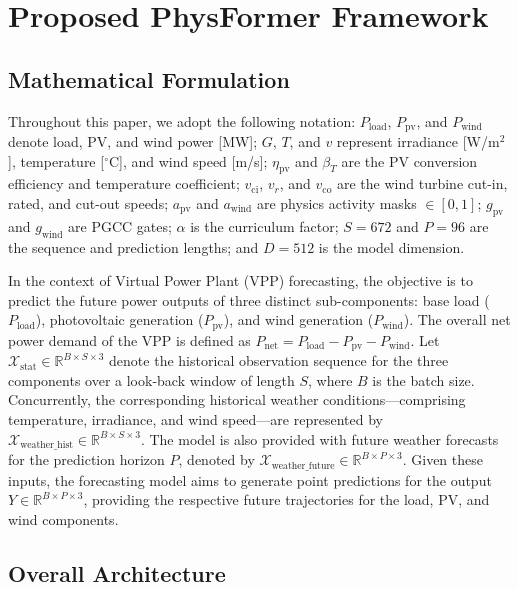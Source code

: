 \section{Proposed PhysFormer Framework}
\label{sec:method}

\subsection{Mathematical Formulation}
Throughout this paper, we adopt the following notation: $P_{\text{load}}$, $P_{\text{pv}}$, and $P_{\text{wind}}$ denote load, PV, and wind power [MW]; $G$, $T$, and $v$ represent irradiance [W/m$^2$], temperature [$^\circ$C], and wind speed [m/s]; $\eta_{\text{pv}}$ and $\beta_T$ are the PV conversion efficiency and temperature coefficient; $v_{\text{ci}}$, $v_r$, and $v_{\text{co}}$ are the wind turbine cut-in, rated, and cut-out speeds; $a_{\text{pv}}$ and $a_{\text{wind}}$ are physics activity masks $\in[0,1]$; $g_{\text{pv}}$ and $g_{\text{wind}}$ are PGCC gates; $\alpha$ is the curriculum factor; $S=672$ and $P=96$ are the sequence and prediction lengths; and $D=512$ is the model dimension.

In the context of Virtual Power Plant (VPP) forecasting, the objective is to predict the future power outputs of three distinct sub-components: base load ($P_{\text{load}}$), photovoltaic generation ($P_{\text{pv}}$), and wind generation ($P_{\text{wind}}$). The overall net power demand of the VPP is defined as $P_{\text{net}} = P_{\text{load}} - P_{\text{pv}} - P_{\text{wind}}$. Let $\mathcal{X}_{\text{stat}} \in \mathbb{R}^{B \times S \times 3}$ denote the historical observation sequence for the three components over a look-back window of length $S$, where $B$ is the batch size. Concurrently, the corresponding historical weather conditions---comprising temperature, irradiance, and wind speed---are represented by $\mathcal{X}_{\text{weather\_hist}} \in \mathbb{R}^{B \times S \times 3}$. The model is also provided with future weather forecasts for the prediction horizon $P$, denoted by $\mathcal{X}_{\text{weather\_future}} \in \mathbb{R}^{B \times P \times 3}$. Given these inputs, the forecasting model aims to generate point predictions for the output $Y \in \mathbb{R}^{B \times P \times 3}$, providing the respective future trajectories for the load, PV, and wind components.

\subsection{Overall Architecture}

